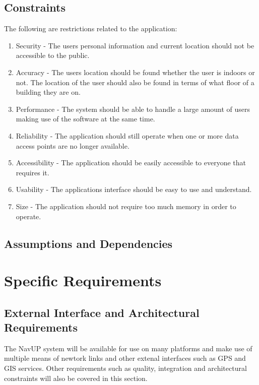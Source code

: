 \documentclass[12pt,a4paper]{report}
\begin{document}
	\subsection*{Constraints}
	The following are restrictions related to the application:
		\begin{enumerate}
				\renewcommand{\labelenumi}{{\textbf{\arabic{enumi}.}}}
				\item Security  - The users personal information and current location should not be accessible to the public.
				\item Accuracy - The users location should be found whether the user is indoors or not. The location of the user should also be found in terms of what floor of a building they are on.
				\item Performance - The system should be able to handle a large amount of users making use of the software at the same time.
				\item Reliability - The application should still operate when one or more data access points are no longer available.
				\item Accessibility - The application should be easily accessible to everyone that requires it.
				\item Usability - The applications interface should be easy to use and understand.
				\item Size - The application should not require too much memory in order to operate.
				\end{enumerate}
	\subsection*{Assumptions and Dependencies}

\newpage
\section*{Specific Requirements}

	\subsection*{External Interface and Architectural Requirements}
		
		The NavUP system will be available for use on many platforms and make use of multiple means of newtork links and other extenal interfaces such as GPS and GIS services.
		Other requirements such as quality, integration and architectural constraints will also be covered in this section.
		
\end{document}
